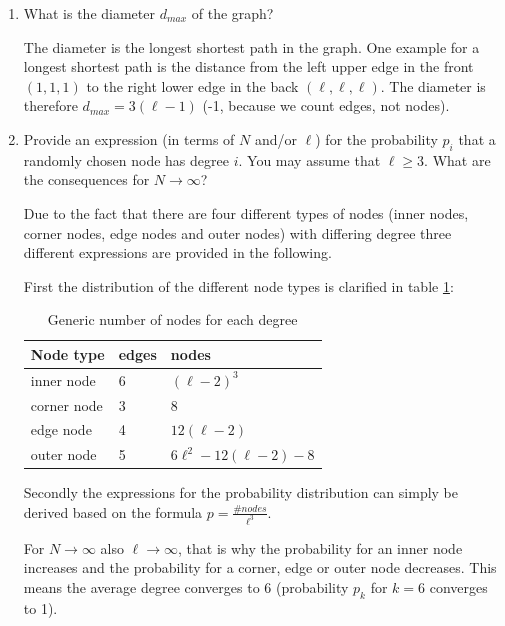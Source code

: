 \begin{enumerate}
	\item What is the diameter $d_{max}$ of the graph?
	\vspace{0.25cm}
	
	The diameter is the longest shortest path in the graph. One example for a longest shortest path is the distance from the left upper edge in the front $(1,1,1)$ to the right lower edge in the back $(\ell,\ell,\ell)$. The diameter is therefore $d_{max} = 3(\ell-1)$ (-1, because we count edges, not nodes).
	
	\item Provide an expression (in terms of $N$ and/or $\ell$) for the probability $p_i$ that a randomly chosen node has degree $i$. You may assume that $\ell \geq 3$. What are the consequences for $N \rightarrow \infty$?
	\vspace{0.25cm}
	
	Due to the fact that there are four different types of nodes (inner nodes, corner nodes, edge nodes and outer nodes) with differing degree three different expressions are provided in the following.
	
	First the distribution of the different node types is clarified in table \ref{tab:node_distribution}:
	
	\begin{table}[h]
	\centering
	\begin{tabular}{l|l|l}
		\hline
		\rowcolor{lightgray}
		Node type & edges & nodes \\ 
		\hline
		inner node    & 6 & $(\ell-2)^3$ \\
		\hline
		corner node    & 3 & $8$ \\
		\hline
		edge node    & 4  & $12(\ell - 2)$ \\
		\hline
		outer node    & 5  & $6\ell^2 - 12(\ell - 2) - 8$ \\
		\hline
	\end{tabular}
	\caption{Generic number of nodes for each degree}
	\label{tab:node_distribution}
	\end{table}

	Secondly the expressions for the probability distribution can simply be derived based on the formula $p=\frac{\#nodes}{\ell^3}$.
		
	For $N \rightarrow \infty$ also $\ell \rightarrow \infty$, that is why the probability for an inner node increases and the probability for a corner, edge or outer node decreases. This means the average degree converges to 6 (probability $p_k$ for $k=6$ converges to 1).
	

\end{enumerate}
